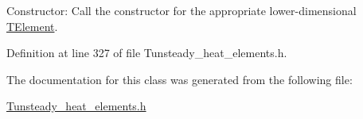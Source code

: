 Constructor\+: Call the constructor for the appropriate lower-\/dimensional \hyperlink{classoomph_1_1TElement}{T\+Element}. 



Definition at line 327 of file Tunsteady\+\_\+heat\+\_\+elements.\+h.



The documentation for this class was generated from the following file\+:\begin{DoxyCompactItemize}
\item 
\hyperlink{Tunsteady__heat__elements_8h}{Tunsteady\+\_\+heat\+\_\+elements.\+h}\end{DoxyCompactItemize}
